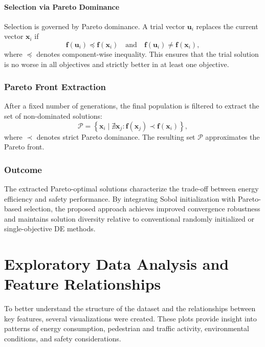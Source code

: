 \documentclass[conference]{IEEEtran}
\begin{document}
\paragraph{Selection via Pareto Dominance}

Selection is governed by Pareto dominance. A trial vector $\mathbf{u}_i$ replaces the current vector $\mathbf{x}_i$ if
\begin{equation}
\mathbf{f}(\mathbf{u}_i) \preceq \mathbf{f}(\mathbf{x}_i)
\quad \text{and} \quad
\mathbf{f}(\mathbf{u}_i) \neq \mathbf{f}(\mathbf{x}_i),
\end{equation}
where $\preceq$ denotes component-wise inequality. This ensures that the trial solution is no worse in all objectives and strictly better in at least one objective.

\subsubsection{Pareto Front Extraction}

After a fixed number of generations, the final population is filtered to extract the set of non-dominated solutions:
\begin{equation}
\mathcal{P} = \left\{ \mathbf{x}_i \mid \nexists \mathbf{x}_j : \mathbf{f}(\mathbf{x}_j) \prec \mathbf{f}(\mathbf{x}_i) \right\},
\end{equation}
where $\prec$ denotes strict Pareto dominance. The resulting set $\mathcal{P}$ approximates the Pareto front.

\subsubsection{Outcome}

The extracted Pareto-optimal solutions characterize the trade-off between energy efficiency and safety performance. By integrating Sobol initialization with Pareto-based selection, the proposed approach achieves improved convergence robustness and maintains solution diversity relative to conventional randomly initialized or single-objective DE methods.


\section{Exploratory Data Analysis and Feature Relationships}
To better understand the structure of the dataset and the relationships between key features, several visualizations were created. These plots provide insight into patterns of energy consumption, pedestrian and traffic activity, environmental conditions, and safety considerations.
\end{document}
